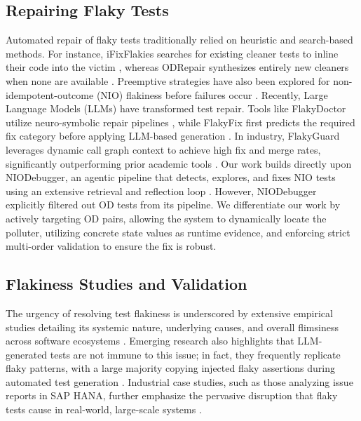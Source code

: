 \documentclass[conference]{IEEEtran}
\begin{document}
\subsection{Repairing Flaky Tests}
Automated repair of flaky tests traditionally relied on heuristic and search-based methods. For instance, iFixFlakies searches for existing cleaner tests to inline their code into the victim \cite{shi2019ifixflakies}, whereas ODRepair synthesizes entirely new cleaners when none are available \cite{li2022odrepair}. Preemptive strategies have also been explored for non-idempotent-outcome (NIO) flakiness before failures occur \cite{wei2022nio}. Recently, Large Language Models (LLMs) have transformed test repair. Tools like FlakyDoctor utilize neuro-symbolic repair pipelines \cite{chen2024flakydoctor}, while FlakyFix first predicts the required fix category before applying LLM-based generation \cite{fatima2024flakyfix}. In industry, FlakyGuard leverages dynamic call graph context to achieve high fix and merge rates, significantly outperforming prior academic tools \cite{li2025flakyguard}. Our work builds directly upon NIODebugger, an agentic pipeline that detects, explores, and fixes NIO tests using an extensive retrieval and reflection loop \cite{ke2025niodebugger}. However, NIODebugger explicitly filtered out OD tests from its pipeline. We differentiate our work by actively targeting OD pairs, allowing the system to dynamically locate the polluter, utilizing concrete state values as runtime evidence, and enforcing strict multi-order validation to ensure the fix is robust.

\subsection{Flakiness Studies and Validation}
The urgency of resolving test flakiness is underscored by extensive empirical studies detailing its systemic nature, underlying causes, and overall flimsiness across software ecosystems \cite{parry2021survey, parry2025systemic, parry2026flimsiness}. Emerging research also highlights that LLM-generated tests are not immune to this issue; in fact, they frequently replicate flaky patterns, with a large majority copying injected flaky assertions during automated test generation \cite{berndt2026llmflaky}. Industrial case studies, such as those analyzing issue reports in SAP HANA, further emphasize the pervasive disruption that flaky tests cause in real-world, large-scale systems \cite{berndt2026saphana}.
\end{document}
